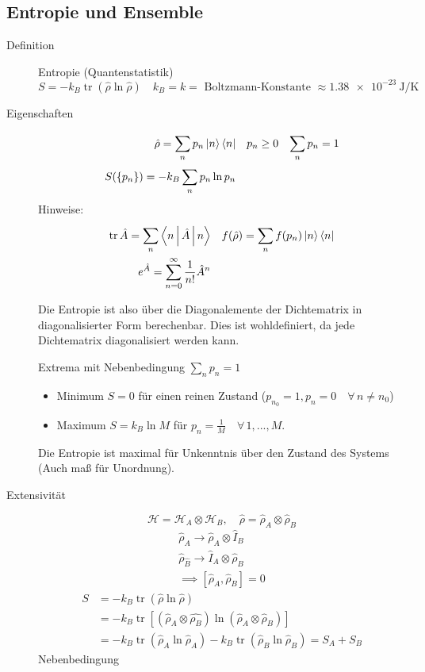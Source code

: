\documentclass[11pt]{article}
\theoremstyle{plain}
\newcommand{\trace}{\operatorname{tr}}
\newcommand{\oo}{\infty}
\begin{document}
\subsection*{Entropie und Ensemble}
\begin{description}
  \item[Definition] Entropie (Quantenstatistik) \\
    \[ S =-k_B \trace(\hat{\rho} \ln{\hat{\rho}}) \quad k_B = k = 
      \text{ Boltzmann-Konstante }
    \approx \SI{1,38e-23}{\joule\per\kelvin} \] 
  \item[Eigenschaften] 
    \begin{align*}
      \hat{\rho} = \sum_{n}^{} p_n \Ket{n}\Bra{n} && p_n \ge 0 && \sum_{n}^{} p_n = 1 \\
      S(\left\{ p_n \right\}) = -k_B \sum_{n}^{} p_n \ln{p_n}
    \end{align*}
    Hinweise: \begin{align*}
      \trace \hat{A} = \sum_{n}^{} \Braket{n | \hat{A}|n} && f(\hat{\rho})= 
      \sum_{n}^{} f( p_n) \Ket{n}\Bra{n} \\
      e^{\hat{A}}= \sum_{n=0}^{ \oo } \frac{1}{n!}\hat{A}^n
    \end{align*}

    Die Entropie ist also \"uber die Diagonalemente der Dichtematrix in
    diagonalisierter Form berechenbar. Dies ist wohldefiniert, da jede
    Dichtematrix diagonalisiert werden kann.

    Extrema mit Nebenbedingung $\sum_{n}^{} p_n = 1$
    \begin{itemize}
      \item Minimum $S=0$ f\"ur einen reinen Zustand ($p_{n_0}=1, p_n =0
        \quad\forall\, n \neq n_0$)
      \item Maximum $S= k_B \ln{M}$ f\"ur $p_n = \frac{1}{M} \quad\forall\, 1,...,M$.
    \end{itemize}
    Die Entropie ist maximal f\"ur Unkenntnis \"uber den Zustand des Systems
    (Auch ma\ss{} f\"ur Unordnung).
  \item[Extensivit\"at] \[ \mathcal{H}= \mathcal{H}_A \otimes \mathcal{H}_B,
  \quad \hat{\rho} = \hat{\rho}_A \otimes  \hat{\rho}_B \] 
  \begin{align*}
    \hat{\rho}_A \to  \hat{\rho}_A \otimes  \hat{I}_B  \\
    \hat{\rho}_{\hat{B}} \to  \hat{I}_A \otimes  \hat{\rho}_B \\
    \implies \left[ \hat{\rho}_A, \hat{\rho}_B  \right]= 0
  \end{align*}
  \begin{align*}
    S & = -k_B \trace( \hat{\rho} \ln{\hat{\rho}})  \\
      & =  -k_B \trace \left[ (\hat{\rho}_A \otimes \hat{\rho_B}) 
  \ln{(\hat{\rho}_A \otimes \hat{\rho}_B)}  \right]  \\
  & = -k_B \trace (\hat{\rho}_A \ln{ \hat{\rho}_A}) - k_B \trace
    (\hat{\rho}_B \ln{ \hat{\rho}_B}) = S_A + S_B
  \end{align*}
  Nebenbedingung


\end{description}
\end{document}
